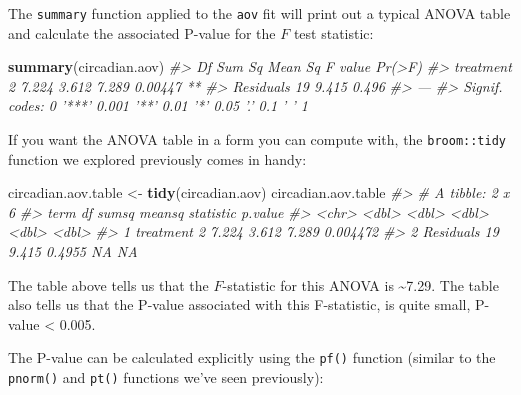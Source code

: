 \documentclass[]{book}
\newenvironment{Shaded}{\begin{snugshade}}{\end{snugshade}}
\newcommand{\CommentTok}[1]{\textcolor[rgb]{0.56,0.35,0.01}{\textit{#1}}}
\newcommand{\DataTypeTok}[1]{\textcolor[rgb]{0.13,0.29,0.53}{#1}}
\newcommand{\DecValTok}[1]{\textcolor[rgb]{0.00,0.00,0.81}{#1}}
\newcommand{\KeywordTok}[1]{\textcolor[rgb]{0.13,0.29,0.53}{\textbf{#1}}}
\newcommand{\NormalTok}[1]{#1}
\newcommand{\OperatorTok}[1]{\textcolor[rgb]{0.81,0.36,0.00}{\textbf{#1}}}
\newcommand{\OtherTok}[1]{\textcolor[rgb]{0.56,0.35,0.01}{#1}}
\newcommand{\StringTok}[1]{\textcolor[rgb]{0.31,0.60,0.02}{#1}}
\theoremstyle{definition}
\theoremstyle{definition}
\theoremstyle{definition}
\theoremstyle{remark}
\begin{document}
The \texttt{summary} function applied to the \texttt{aov} fit will print
out a typical ANOVA table and calculate the associated P-value for the
\(F\) test statistic:

\begin{Shaded}
\begin{Highlighting}[]
\KeywordTok{summary}\NormalTok{(circadian.aov)}
\CommentTok{#>             Df Sum Sq Mean Sq F value  Pr(>F)   }
\CommentTok{#> treatment    2  7.224   3.612   7.289 0.00447 **}
\CommentTok{#> Residuals   19  9.415   0.496                   }
\CommentTok{#> ---}
\CommentTok{#> Signif. codes:  0 '***' 0.001 '**' 0.01 '*' 0.05 '.' 0.1 ' ' 1}
\end{Highlighting}
\end{Shaded}

If you want the ANOVA table in a form you can compute with, the
\texttt{broom::tidy} function we explored previously comes in handy:

\begin{Shaded}
\begin{Highlighting}[]
\NormalTok{circadian.aov.table <-}\StringTok{ }\KeywordTok{tidy}\NormalTok{(circadian.aov)}
\NormalTok{circadian.aov.table}
\CommentTok{#> # A tibble: 2 x 6}
\CommentTok{#>   term         df sumsq meansq statistic   p.value}
\CommentTok{#>   <chr>     <dbl> <dbl>  <dbl>     <dbl>     <dbl>}
\CommentTok{#> 1 treatment     2 7.224 3.612      7.289  0.004472}
\CommentTok{#> 2 Residuals    19 9.415 0.4955    NA     NA}
\end{Highlighting}
\end{Shaded}

The table above tells us that the \(F\)-statistic for this ANOVA is
\textasciitilde{}7.29. The table also tells us that the P-value
associated with this F-statistic, is quite small, P-value \textless{}
0.005.

The P-value can be calculated explicitly using the \texttt{pf()}
function (similar to the \texttt{pnorm()} and \texttt{pt()} functions
we've seen previously):

\begin{Shaded}
\end{Shaded}
\end{document}

